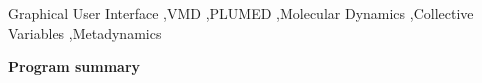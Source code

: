 \documentclass[preprint,12pt]{elsarticle}
\begin{document}
\begin{frontmatter}



\begin{keyword}
Graphical User Interface \sep VMD \sep PLUMED \sep Molecular Dynamics \sep Collective Variables \sep Metadynamics 
\end{keyword}

\end{frontmatter}



{\bf Program summary}
\end{document}
